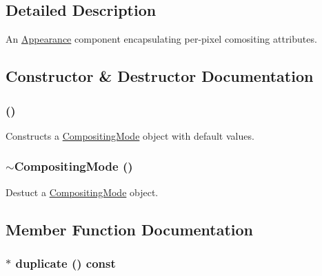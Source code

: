 \subsection{Detailed Description}
An \hyperlink{classm3g_1_1Appearance}{Appearance} component encapsulating per-pixel comositing attributes. 

\subsection{Constructor \& Destructor Documentation}
\hypertarget{classm3g_1_1CompositingMode_5abfd1a798f1327aac4b92f55d4ecc0c}{
\subsubsection[{CompositingMode}]{ ()}}
\label{classm3g_1_1CompositingMode_5abfd1a798f1327aac4b92f55d4ecc0c}


Constructs a \hyperlink{classm3g_1_1CompositingMode}{CompositingMode} object with default values. \hypertarget{classm3g_1_1CompositingMode_0bba5b15be7249e946c9aaf94631ce3b}{
\subsubsection[{$\sim$CompositingMode}]{\setlength{\rightskip}{0pt plus 5cm}$\sim${\bf CompositingMode} ()}}
\label{classm3g_1_1CompositingMode_0bba5b15be7249e946c9aaf94631ce3b}


Destuct a \hyperlink{classm3g_1_1CompositingMode}{CompositingMode} object. 

\subsection{Member Function Documentation}
\hypertarget{classm3g_1_1CompositingMode_ab6fcd945b68728bbe2c65a8f45dc8dd}{
\subsubsection[{duplicate}]{ $\ast$ duplicate () const}}
\label{classm3g_1_1CompositingMode_ab6fcd945b68728bbe2c65a8f45dc8dd}


